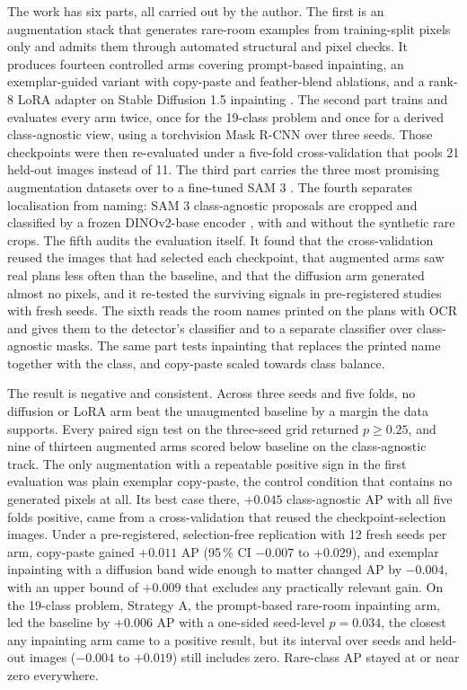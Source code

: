 The work has six parts, all carried out by the author. The first is an
augmentation stack that generates rare-room examples from training-split pixels
only and admits them through automated structural and pixel checks. It produces
fourteen controlled arms covering prompt-based inpainting, an exemplar-guided
variant with copy-paste and feather-blend ablations, and a rank-8 LoRA adapter
\cite{hu2022lora} on Stable Diffusion 1.5 inpainting \cite{rombach2022ldm}. The
second part trains and evaluates every arm twice, once for the 19-class problem
and once for a derived class-agnostic view, using a torchvision Mask R-CNN
\cite{he2017maskrcnn} over three seeds. Those checkpoints were then re-evaluated
under a five-fold cross-validation that pools 21 held-out images instead of 11.
The third part carries the three most promising augmentation datasets over to a
fine-tuned SAM 3 \cite{carion2025sam3}. The fourth separates localisation from
naming: SAM 3 class-agnostic proposals are cropped and classified by a frozen
DINOv2-base encoder \cite{oquab2024dinov2}, with and without the synthetic rare crops.
The fifth audits the evaluation itself. It found that the cross-validation
reused the images that had selected each checkpoint, that augmented arms saw
real plans less often than the baseline, and that the diffusion arm generated
almost no pixels, and it re-tested the surviving signals in pre-registered
studies with fresh seeds. The sixth reads the room names printed on the plans
with OCR and gives them to the detector's classifier and to a separate
classifier over class-agnostic masks. The same part tests inpainting that
replaces the printed name together with the class, and copy-paste scaled
towards class balance.

The result is negative and consistent. Across three seeds and five folds, no
diffusion or LoRA arm beat the unaugmented baseline by a margin the data
supports. Every paired sign test on the three-seed grid returned $p \ge 0.25$,
and nine of thirteen augmented arms scored below baseline on the class-agnostic
track. The only augmentation with a repeatable positive sign in the first evaluation
was plain exemplar copy-paste, the control condition that contains no
generated pixels at all. Its best case there, $+0.045$ class-agnostic AP with
all five folds positive, came from a cross-validation that reused the
checkpoint-selection images. Under a pre-registered, selection-free
replication with 12 fresh seeds per arm, copy-paste gained $+0.011$ AP (95\,\%
CI $-0.007$ to $+0.029$), and exemplar inpainting with a diffusion band wide
enough to matter changed AP by $-0.004$, with an upper bound of $+0.009$ that
excludes any practically relevant gain. On the 19-class problem, Strategy A, the prompt-based rare-room inpainting arm, led the baseline by $+0.006$ AP with a one-sided seed-level $p = 0.034$, the closest any inpainting arm came to a positive result, but its interval over seeds and held-out images ($-0.004$ to $+0.019$) still includes zero. Rare-class AP stayed
at or near zero everywhere.


